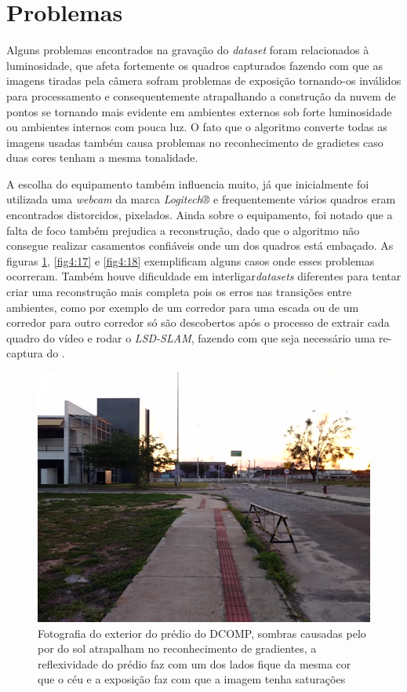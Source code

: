 \section{Problemas}

Alguns problemas encontrados na gravação do \textit{dataset} foram relacionados à luminosidade, que afeta fortemente os quadros capturados fazendo com que as imagens tiradas pela câmera sofram problemas de exposição tornando-os inválidos para processamento e consequentemente atrapalhando a construção da nuvem de pontos se tornando mais evidente em ambientes externos sob forte luminosidade ou ambientes internos com pouca luz. O fato que o algoritmo converte todas as imagens usadas também causa problemas no reconhecimento de gradietes caso duas cores tenham a mesma tonalidade. 

A escolha do equipamento também influencia muito, já que inicialmente foi utilizada uma \textit{webcam} da marca \textit{Logitech®} e frequentemente vários quadros eram encontrados distorcidos, pixelados. Ainda sobre o equipamento, foi notado que a falta de foco também prejudica a reconstrução, dado que o algoritmo não consegue realizar casamentos confiáveis onde um dos quadros está embaçado. As figuras \ref{fig4:16}, \ref{fig4:17} e \ref{fig4:18}  exemplificam alguns casos onde esses problemas ocorreram. Também houve dificuldade em interligar\textit{datasets} diferentes para tentar criar uma reconstrução mais completa pois os erros nas transições entre ambientes, como por exemplo de um corredor para uma escada ou de um corredor para outro corredor só são descobertos após o processo de extrair cada quadro do vídeo e rodar o \textit{LSD-SLAM}, fazendo com que seja necessário uma re-captura do . 

\begin{figure}[H]
	\centering
		\includegraphics[width= \textwidth]{Imagens/figura4-16.jpg}
		\caption{Fotografia do exterior do prédio do DCOMP, sombras causadas pelo por do sol atrapalham no reconhecimento de gradientes, a reflexividade do prédio faz com um dos lados fique da mesma cor que o céu e a exposição faz com que a imagem tenha saturações}
	\label{fig4:16}
\end{figure}

